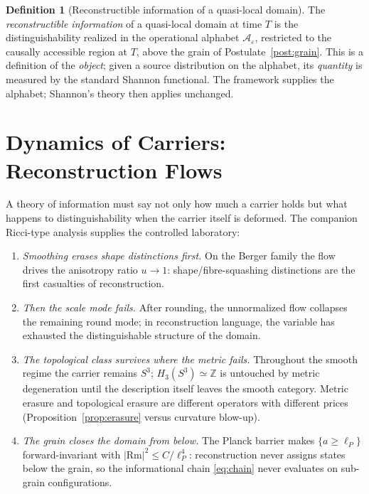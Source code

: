 \documentclass[11pt,a4paper]{article}
\theoremstyle{definition}
\newtheorem{definition}[theorem]{Definition}
\theoremstyle{remark}
\newcommand{\Sthree}{S^{3}}
\newcommand{\Z}{\mathbb{Z}}
\newcommand{\lP}{\ell_{P}}
\begin{document}
\begin{definition}[Reconstructible information of a quasi-local domain]
\label{def:reconstructible}
The \emph{reconstructible information} of a quasi-local domain at time $T$ is the
distinguishability realized in the operational alphabet $\mathcal A_{\varepsilon}$, restricted
to the causally accessible region at $T$, above the grain of Postulate~\ref{post:grain}.  This
is a definition of the \emph{object}; given a source distribution on the alphabet, its
\emph{quantity} is measured by the standard Shannon functional.  The framework supplies the
alphabet; Shannon's theory then applies unchanged.
\end{definition}

\section{Dynamics of Carriers: Reconstruction Flows}
\label{sec:dynamics}

A theory of information must say not only how much a carrier holds but what happens to
distinguishability when the carrier itself is deformed.  The companion Ricci-type analysis
\cite{BP2026ricci} supplies the controlled laboratory:

\begin{enumerate}[label=(\alph*)]
\item \emph{Smoothing erases shape distinctions first.}  On the Berger family the flow drives
the anisotropy ratio $u\to1$: shape/fibre-squashing distinctions are the first casualties of
reconstruction.
\item \emph{Then the scale mode fails.}  After rounding, the unnormalized flow collapses the
remaining round mode; in reconstruction language, the variable has exhausted the distinguishable
structure of the domain.
\item \emph{The topological class survives where the metric fails.}  Throughout the smooth
regime the carrier remains $\Sthree$; $H_{3}(\Sthree)\simeq\Z$ is untouched by metric
degeneration until the description itself leaves the smooth category.  Metric erasure and
topological erasure are different operators with different prices
(Proposition~\ref{prop:erasure} versus curvature blow-up).
\item \emph{The grain closes the domain from below.}  The Planck barrier makes
$\{a\ge\lP\}$ forward-invariant with $|\mathrm{Rm}|^{2}\le C/\lP^{4}$: reconstruction never
assigns states below the grain, so the informational chain \eqref{eq:chain} never evaluates on
sub-grain configurations.
\end{enumerate}
\end{document}
